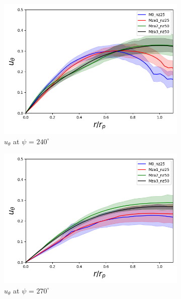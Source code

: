 \begin{figure}[H]
	\centering
	\begin{subfigure}[b]{0.475\textwidth}
	\centering
	\includegraphics[width=1\textwidth]{figures/zonal_adapt_results/LEV/u_theta/phase_240.png}
	\caption{ $u_\theta$ at $\psi$ = $240^\circ$}
	\label{fig:zonal_utheta_240}
	\end{subfigure}
	\begin{subfigure}[b]{0.475\textwidth}
	\centering
	\includegraphics[width=1\textwidth]{figures/zonal_adapt_results/LEV/u_theta/phase_270.png}
	\caption{ $u_\theta$ at $\psi$ = $270^\circ$}
	\label{fig:zonal_utheta_270}
    \end{subfigure}
	\begin{subfigure}[b]{0.475\textwidth}

\end{subfigure}
\end{figure}
